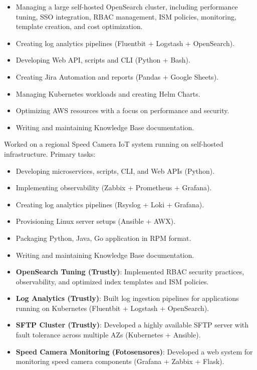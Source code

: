 \documentclass[10pt,a4paper]{altacv}
\begin{document}
\bigskip

\begin{itemize}
    \item Managing a large self-hosted OpenSearch cluster, including performance tuning, SSO integration, RBAC management, ISM policies, monitoring, template creation, and cost optimization.
    \item Creating log analytics pipelines (Fluentbit + Logstash + OpenSearch).
    \item Developing Web API, scripts and CLI (Python + Bash).
    \item Creating Jira Automation and reports (Pandas +  Google Sheets).
    \item Managing Kubernetes workloads and creating Helm Charts.
    \item Optimizing AWS resources with a focus on performance and security.
    \item Writing and maintaining Knowledge Base documentation.
\end{itemize}

\divider


Worked on a regional Speed Camera IoT system running on self-hosted infrastructure. Primary tasks:

\bigskip

\begin{itemize}
    \item Developing microservices, scripts, CLI, and Web APIs (Python).
    \item Implementing observability (Zabbix + Prometheus + Grafana).
    \item Creating log analytics pipelines (Rsyslog + Loki + Grafana).
    \item Provisioning Linux server setups (Ansible + AWX).  
    \item Packaging Python, Java, Go application in RPM format.
    \item Writing and maintaining Knowledge Base documentation.  
\end{itemize}

\bigskip
\bigskip


\begin{itemize}
    \item \textbf{OpenSearch Tuning (Trustly)}: Implemented RBAC security practices, observability, and optimized index templates and ISM policies.
    \item \textbf{Log Analytics (Trustly)}: Built log ingestion pipelines for applications running on Kubernetes (Fluentbit + Logstash + OpenSearch).
    \item \textbf{SFTP Cluster (Trustly)}: Developed a highly available SFTP server with fault tolerance across multiple AZs (Kubernetes + Ansible).
    \item \textbf{Speed Camera Monitoring (Fotosensores)}: Developed a web system for monitoring speed camera components (Grafana + Zabbix + Flask).
\end{itemize}


\clearpage
\end{document}
